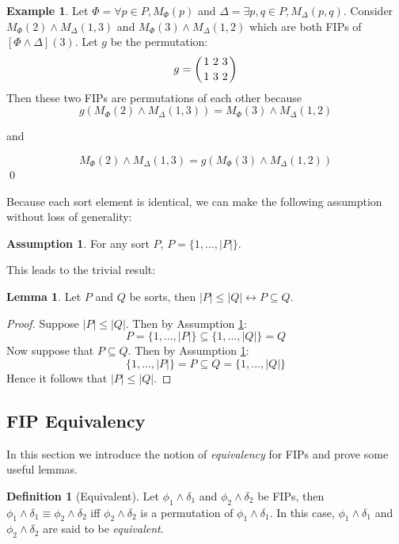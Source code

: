 \documentclass[12pt]{article}
\theoremstyle{definition}
\newtheorem{assumption}{Assumption}
\newtheorem{lemma}{Lemma}
\newtheorem{definition}{Definition}
\newtheorem{example}{Example}
\theoremstyle{remark}
\newcommand{\msp}{\text{ }}
\newcommand{\perm}{\genfrac{}{}{0pt}{}}
\begin{document}
\begin{example}
  Let $\Phi = \forall p \in P, M_{\Phi}(p)$ and $\Delta = \exists p,q \in P, M_{\Delta}(p,q)$.  Consider $M_{\Phi}(2) \land M_{\Delta}(1,3)$ and $M_{\Phi}(3) \land M_{\Delta}(1,2)$ which are both FIPs of $[\Phi\land\Delta](3)$.  Let $g$ be the permutation:
  $$g = \left(\perm{1 \msp 2 \msp 3}{1 \msp 3 \msp 2}\right)$$
  Then these two FIPs are permutations of each other because
  $$g(M_{\Phi}(2) \land M_{\Delta}(1,3)) = M_{\Phi}(3) \land M_{\Delta}(1,2)$$
  \begin{center}
    and
  \end{center}
  $$M_{\Phi}(2) \land M_{\Delta}(1,3) = g(M_{\Phi}(3) \land M_{\Delta}(1,2))$$
  \qed
\end{example}

\noindent Because each sort element is identical, we can make the following assumption without loss of generality:

\begin{assumption}
  \label{asmp:sort}
  For any sort $P$, $P = \{1,...,|P|\}$.  
\end{assumption}

\noindent This leads to the trivial result:

\begin{lemma}
  \label{lem:monot-card}
  Let $P$ and $Q$ be sorts, then $|P| \leq |Q| \leftrightarrow P \subseteq Q$.  
\end{lemma}
\begin{proof}
  Suppose $|P| \leq |Q|$.  Then by Assumption \ref{asmp:sort}:
  $$P = \{1,...,|P|\} \subseteq \{1,...,|Q|\} = Q$$
  Now suppose that $P \subseteq Q$.  Then by Assumption \ref{asmp:sort}:
  $$\{1,...,|P|\} = P \subseteq Q = \{1,...,|Q|\}$$
  Hence it follows that $|P| \leq |Q|$.
\end{proof}


\subsection{FIP Equivalency}

In this section we introduce the notion of \textit{equivalency} for FIPs and prove some useful lemmas.

\begin{definition}[Equivalent]
  Let $\phi_1\land\delta_1$ and $\phi_2\land\delta_2$ be FIPs, then $\phi_1\land\delta_1 \equiv \phi_2\land\delta_2$ iff $\phi_2\land\delta_2$ is a permutation of $\phi_1\land\delta_1$.  In this case, $\phi_1\land\delta_1$ and $\phi_2\land\delta_2$ are said to be \textit{equivalent}.
\end{definition}
\end{document}
